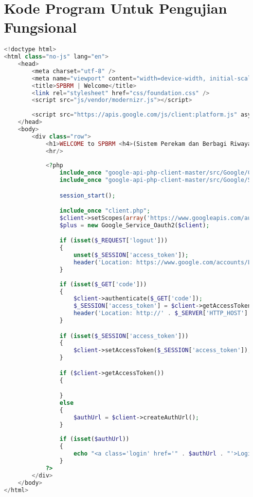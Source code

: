 \chapter{Kode Program Untuk Pengujian Fungsional}
\label{kode_program_pengujian}

\singlespacing 
%
%
\begin{lstlisting}[language=php,basicstyle=\tiny,caption=index.php]
<!doctype html>
<html class="no-js" lang="en">
	<head>
		<meta charset="utf-8" />
		<meta name="viewport" content="width=device-width, initial-scale=1.0" />
		<title>SPBRM | Welcome</title>
		<link rel="stylesheet" href="css/foundation.css" />
		<script src="js/vendor/modernizr.js"></script>
		
		<script src="https://apis.google.com/js/client:platform.js" async defer></script>
	</head>
	<body>
		<div class="row">
			<h1>WELCOME to SPBRM <h4>(Sistem Perekam dan Berbagi Riwayat Mahasiswa)</h4></h1>
			<hr/>
			
			<?php
				include_once "google-api-php-client-master/src/Google/Client.php";
				include_once "google-api-php-client-master/src/Google/Service/Oauth2.php";

				session_start();

				include_once "client.php";
				$client->setScopes(array('https://www.googleapis.com/auth/plus.login','email'));
				$plus = new Google_Service_Oauth2($client);

				if (isset($_REQUEST['logout']))
				{
					unset($_SESSION['access_token']);
					header('Location: https://www.google.com/accounts/Logout?continue=https://appengine.google.com/_ah/logout?continue=http://' . $_SERVER['HTTP_HOST'] . $_SERVER['PHP_SELF']);
				}
			
				if (isset($_GET['code']))
				{
					$client->authenticate($_GET['code']);
					$_SESSION['access_token'] = $client->getAccessToken();
					header('Location: http://' . $_SERVER['HTTP_HOST'] . $_SERVER['PHP_SELF']);
				}

				if (isset($_SESSION['access_token']))
				{
					$client->setAccessToken($_SESSION['access_token']);
				}

				if ($client->getAccessToken()) 
				{

				}
				else
				{
					$authUrl = $client->createAuthUrl();
				}
				
				if (isset($authUrl))
				{
					echo "<a class='login' href='" . $authUrl . "'>Login with Google</a>";
				}
			?>
		</div>
	</body>
</html>
\end{lstlisting}

